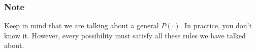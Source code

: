 \documentclass{beamer}
\begin{document}

\begin{frame}
\frametitle{Note}

Keep in mind that we are talking about a general $P(\cdot)$. In practice, you don't know it. However, every possibility must satisfy all these rules we have talked about.

\end{frame}


\end{document}
